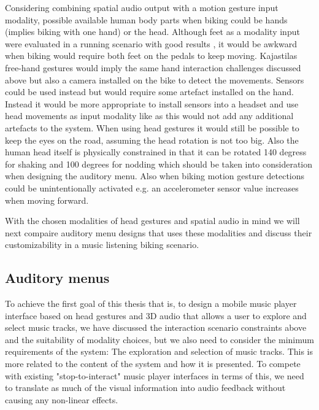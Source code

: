 Considering combining spatial audio output with a motion gesture input modality, possible available human body parts when biking could be hands (implies biking with one hand) or the head. Although feet as a modality input were evaluated in a running scenario with good results \cite{smus_running_2010}, it would be awkward when biking would require both feet on the pedals to keep moving. Kajastilas free-hand gestures \cite{kajastila_interaction_2013} would imply the same hand interaction challenges discussed above but also a camera installed on the bike to detect the movements. Sensors could be used instead but would require some artefact installed on the hand. Instead it would be more appropriate to install sensors into a headset and use head movements as input modality like \cite{park_gaze-directed_2011, brewster_multimodaleyes-freeinteraction_2003} as this would not add any additional artefacts to the system. When using head gestures it would still be possible to keep the eyes on the road, assuming the head rotation is not too big. Also the human head itself is physically constrained in that it can be rotated 140 degress for shaking and 100 degrees for nodding \cite{lopresti_neck_2000} which should be taken into consideration when designing the auditory menu. Also when biking motion gesture detections could be unintentionally activated e.g. an accelerometer sensor value increases when moving forward.

With the chosen modalities of head gestures and spatial audio in mind we will next compaire auditory menu designs that uses these modalities and discuss their customizability in a music listening biking scenario.

\subsection{Auditory menus}
To achieve the first goal of this thesis that is, to design a mobile music player interface based on head gestures and 3D audio that allows a user to explore and select music tracks, we have discussed the interaction scenario constraints above and the suitability of modality choices, but we also need to consider the minimum requirements of the system: The exploration and selection of music tracks. This is more related to the content of the system and how it is presented. To compete with existing "stop-to-interact" music player interfaces in terms of this, we need to translate as much of the visual information into audio feedback without causing any non-linear effects.

